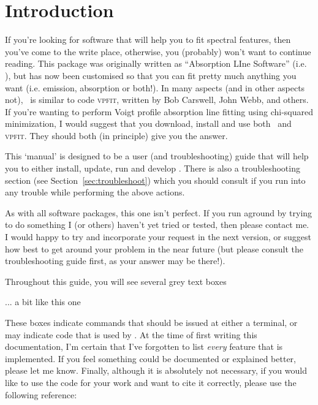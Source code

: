 \section{Introduction}

If you're looking for software that will help you to fit spectral features,
then you've come to the write place, otherwise, you (probably) won't
want to continue reading. This package was originally written as
``Absorption LIne Software'' (i.e. \alis), but has now been customised
so that you can fit pretty much anything you want (i.e. emission, absorption
or both!). In many aspects (and in other aspects not), \alis\ is similar to code
\textsc{vpfit}, written by Bob Carswell, John Webb, and others. If you're wanting
to perform Voigt profile absorption line fitting using chi-squared minimization,
I would suggest that you download, install and use both \alis\ and \textsc{vpfit}.
They should both (in principle) give you the answer.

This `manual' is designed to be a user (and troubleshooting) guide that will
help you to either install, update, run and develop \alis. There is also a
troubleshooting section (see Section~\ref{sec:troubleshoot}) which you
should consult if you run into any trouble while performing the above actions.

As with all software packages, this one isn't perfect. If you run aground
by trying to do something I (or others) haven't yet tried or tested, then
please contact me. I would happy to try and incorporate your request
in the next version, or suggest how best to get around your problem
in the near future (but please consult the troubleshooting guide first,
as your answer may be there!).

Throughout this guide, you will see several grey text boxes

\vspace{0.5cm}
\begin{myenv}
... a bit like this one
\end{myenv}
\vspace{0.3cm}

These boxes indicate commands that should be issued at
either a terminal, or may indicate code that is used by \alis.
At the time of first writing this documentation, I'm certain that
I've forgotten to list \textit{every} feature that is implemented.
If you feel something could be documented or explained
better, please let me know. Finally, although it is absolutely
not necessary, if you would like to use the code for your work
and want to cite it correctly, please use the following reference:


